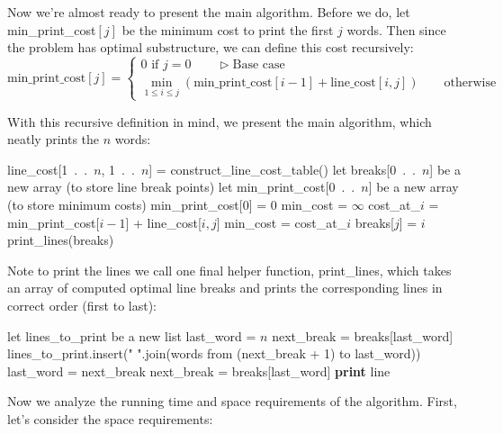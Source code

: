 \documentclass[paper=a4, fontsize=11pt]{scrartcl} %
\numberwithin{equation}{section} %
\numberwithin{figure}{section} %
\numberwithin{table}{section} %
\begin{document}
Now we're almost ready to present the main algorithm. Before we do, let min\_print\_cost$[j]$ be the minimum cost to print the first $j$ words. Then since the problem has optimal substructure, we can define this cost recursively:
\[\textrm{min\_print\_cost}[j] = 
\begin{cases}
0 \textrm{ if } j = 0 \qquad{} \triangleright \textrm{Base case} \\
\min_{1 \leq i \leq j} \left(\textrm{min\_print\_cost}[i - 1] + \textrm{line\_cost}[i,j] \right) \qquad{} \textrm{otherwise}
\end{cases}
\]

With this recursive definition in mind, we present the main algorithm, which neatly prints the $n$ words:

\begin{algorithmic}
 
\State line\_cost[1~.~.~$n$, 1~.~.~$n$] = construct\_line\_cost\_table()
\State let breaks[0~.~.~$n$] be a new array (to store line break points)
\State let min\_print\_cost[0~.~.~$n$] be a new array (to store minimum costs)
\State min\_print\_cost[0] = 0
	\State min\_cost = $\infty$
		\State cost\_at\_$i$ = min\_print\_cost[$i - 1$] + line\_cost[$i,j$]
			\State min\_cost = cost\_at\_$i$
			\State breaks[$j$] = $i$
		\EndIf
	\EndFor
\EndFor
\State print\_lines(breaks)
\EndFunction
\end{algorithmic}

Note to print the lines we call one final helper function, print\_lines, which takes an array of computed optimal line breaks and prints the corresponding lines in correct order (first to last):

\begin{algorithmic}
\State let lines\_to\_print be a new list 
\State last\_word = $n$ 
\State next\_break = breaks[last\_word] 
 
	\State lines\_to\_print.insert(" ".join(words from (next\_break + 1) to last\_word))
	\State last\_word = next\_break
	\State next\_break = breaks[last\_word]
\EndWhile
{}
	\State \textbf{print} line
\EndFor
\EndFunction
\end{algorithmic}

Now we analyze the running time and space requirements of the algorithm. First, let's consider the space requirements:
\end{document}
